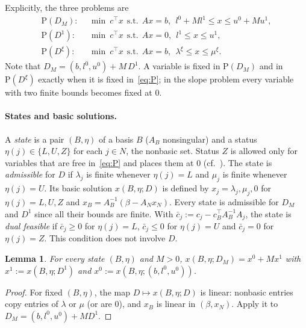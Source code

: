 \documentclass[11pt,a4paper]{article}
\theoremstyle{plain}
\newtheorem{lemma}[theorem]{Lemma}
\theoremstyle{definition}
\theoremstyle{remark}
\newcommand{\Pb}{\mathrm{P}}
\begin{document}
Explicitly, the three problems are
\begin{align*}
  \Pb(D_M):&\ \ \min\ c^\top x\ \ \text{s.t.}\ \ Ax=b,\ \ l^0+Ml^1\le x\le u^0+Mu^1,\\
  \Pb(D^1):&\ \ \min\ c^\top x\ \ \text{s.t.}\ \ Ax=0,\ \ l^1\le x\le u^1,\\
  \Pb(D^\xi):&\ \ \min\ c^\top x\ \ \text{s.t.}\ \ Ax=b,\ \ \lambda^\xi\le x\le \mu^\xi.
\end{align*}
Note that $D_M=(b,l^0,u^0)+M\,D^1$. A variable is fixed in $\Pb(D_M)$ and in $\Pb(D^\xi)$ exactly when it is fixed in~\eqref{eq:P}; in the slope problem every variable with two finite bounds becomes fixed at $0$.

\paragraph{States and basic solutions.}
A \emph{state} is a pair $(B,\eta)$ of a basis $B$ ($A_B$ nonsingular) and a status $\eta(j)\in\{L,U,Z\}$ for each $j\in N$, the nonbasic set. Status $Z$ is allowed only for variables that are free in~\eqref{eq:P} and places them at $0$ (cf.~\cite{maros2003}). The state is \emph{admissible} for $D$ if $\lambda_j$ is finite whenever $\eta(j)=L$ and $\mu_j$ is finite whenever $\eta(j)=U$. Its basic solution $x(B,\eta;D)$ is defined by $x_j=\lambda_j,\mu_j,0$ for $\eta(j)=L,U,Z$ and $x_B=A_B^{-1}(\beta-A_Nx_N)$. Every state is admissible for $D_M$ and $D^1$ since all their bounds are finite. With $\bar c_j:=c_j-c_B^\top A_B^{-1}A_j$, the state is \emph{dual feasible} if $\bar c_j\ge0$ for $\eta(j)=L$, $\bar c_j\le0$ for $\eta(j)=U$ and $\bar c_j=0$ for $\eta(j)=Z$. This condition does not involve $D$.

\begin{lemma}
\label{lem:affine}
For every state $(B,\eta)$ and $M>0$,
$x(B,\eta;D_M)=x^0+Mx^1$ with $x^1:=x(B,\eta;D^1)$ and $x^0:=x(B,\eta;(b,l^0,u^0))$.
\end{lemma}
\begin{proof}
For fixed $(B,\eta)$, the map $D\mapsto x(B,\eta;D)$ is linear: nonbasic entries copy entries of $\lambda$ or $\mu$ (or are $0$), and $x_B$ is linear in $(\beta,x_N)$. Apply it to $D_M=(b,l^0,u^0)+MD^1$.
\end{proof}
\end{document}

